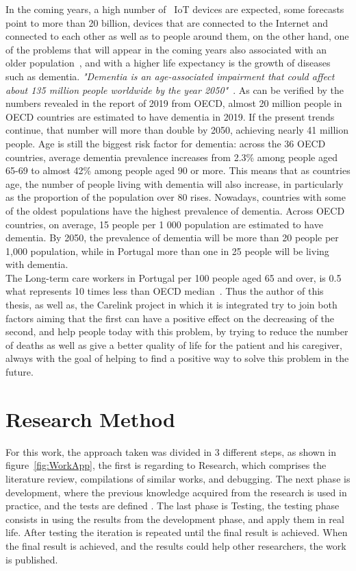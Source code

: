 In the coming years, a high number of ~\gls{IoT} devices are expected, some forecasts point to more than 20 billion, devices that are connected to the Internet and connected to each other as well as to people around them, on the other hand, one of the problems that will appear in the coming years also associated with an older population~\cite{pordata_pt,pordata_EU}, and with a higher life expectancy is the growth of diseases such as dementia.
\textit{"Dementia is an age-associated impairment that could affect about 135 million people worldwide by the year 2050"}~\cite{Hammoud2018}.
As can be verified by the numbers revealed in the report of 2019 from OECD, almost 20 million people in OECD countries are estimated to have dementia in 2019. If the present trends continue, that number will more than double by 2050, achieving nearly 41 million people. Age is still the biggest risk factor for dementia: across the 36 OECD countries, average dementia prevalence increases from 2.3\% among people aged 65-69 to almost 42\% among people aged 90 or more. 
This means that as countries age, the number of people living with dementia will also increase, in particularly as the proportion of the population over 80 rises. 
Nowadays, countries with some of the oldest populations have the highest prevalence of dementia. Across OECD countries, on average, 15 people per 1 000 population are estimated to have dementia. 
By 2050, the prevalence of dementia will be more than 20 people per 1,000 population, while in Portugal more than one in 25 people will be living with dementia.~\cite{oecdcare}
\\The Long-term care workers in Portugal per 100 people aged 65 and over, is  0.5 what represents 10 times less than OECD median~\cite{OECD2019a}.
Thus the author of this thesis, as well as, the Carelink project in which it is integrated try to join both factors aiming that the first can have a positive effect on the  decreasing of the second, and help people today with this problem, by trying to reduce the number of deaths as well as  give a better quality of life for the  patient and his caregiver, always with the goal of  helping to find a positive way to solve this problem in the future. 


\section{Research Method}
\label{sec:research_method}
For this work, the approach taken was divided in 3 different steps, as shown in figure~\ref{fig:WorkApp}, the first is regarding to Research, which comprises the literature review, compilations of similar works, and debugging. The next phase is development, where the previous knowledge acquired from the research is used in practice, and the tests are defined . The last phase is Testing, the testing phase consists in using the results from the development phase, and apply them in real life. After testing the iteration is repeated until the final result is achieved. When the final result is achieved, and the results could help other researchers, the work is published.


